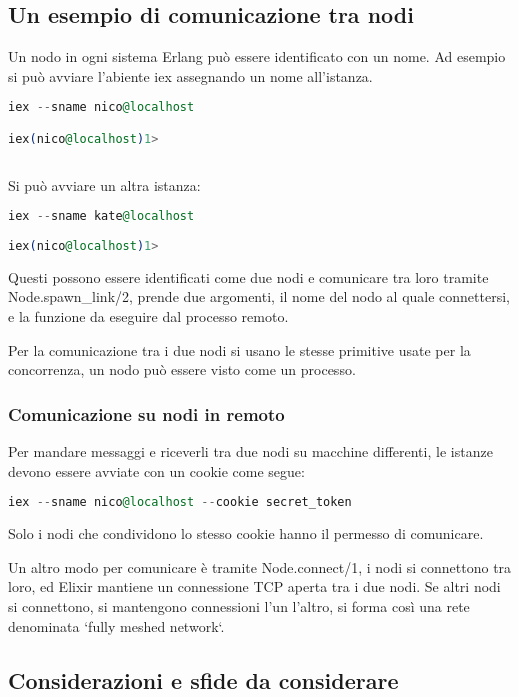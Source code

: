 \subsection{Un esempio di comunicazione tra nodi}

Un nodo in ogni sistema Erlang può essere identificato
con un nome. Ad esempio si può avviare l'abiente iex
assegnando un nome all'istanza.

\begin{lstlisting}[language=elixir]
iex --sname nico@localhost

iex(nico@localhost)1> 
	
\end{lstlisting}

Si può avviare un altra istanza:

\begin{lstlisting}[language=elixir]
iex --sname kate@localhost
	
iex(nico@localhost)1> 
\end{lstlisting}

Questi possono essere identificati come due nodi
e comunicare tra loro tramite Node.spawn\_link/2,
prende due argomenti, il nome del nodo al quale connettersi,
e la funzione da eseguire dal processo remoto.

Per la comunicazione tra i due nodi si usano le
stesse primitive usate per la concorrenza, un nodo
può essere visto come un processo.

\subsubsection{Comunicazione su nodi in remoto}

Per mandare messaggi e riceverli tra due nodi
su macchine differenti, le istanze devono
essere avviate con un cookie come segue:

\begin{lstlisting}[language=elixir]
iex --sname nico@localhost --cookie secret_token
\end{lstlisting}

Solo i nodi che condividono lo stesso cookie hanno
il permesso di comunicare.

Un altro modo per comunicare è tramite Node.connect/1,
i nodi si connettono tra loro, ed Elixir mantiene un
connessione TCP aperta tra i due nodi.
Se altri nodi si connettono, si mantengono connessioni
l'un l'altro, si forma così una rete denominata `fully meshed network`.


\subsection{Considerazioni e sfide da considerare}

